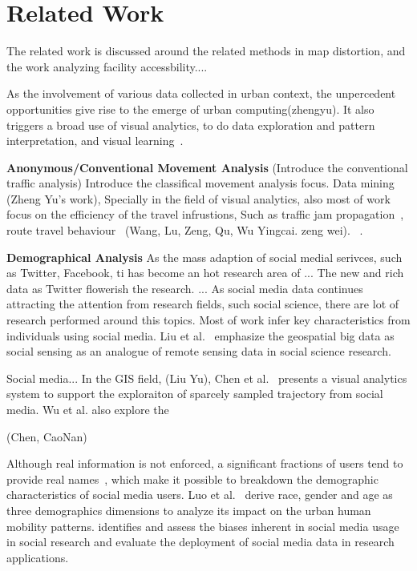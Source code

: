 \section{Related Work}

The related work is discussed around the related methods in map distortion, and the work analyzing facility accessbility....

As the involvement of various data collected in urban context, the unpercedent opportunities give rise to the emerge of urban computing(zhengyu). It also triggers a broad use of visual analytics, to do data exploration and pattern interpretation, and visual learning~\cite{zheng2016visual}. 

\textbf{Anonymous/Conventional Movement Analysis} (Introduce the conventional traffic analysis) Introduce the classifical movement analysis focus. Data mining (Zheng Yu's work), Specially in the field of visual analytics, also most of work focus on the efficiency of the travel infrustions, Such as traffic jam propagation~\cite{wang2013visual}, route travel behaviour~\cite{lu2015trajrank} (Wang, Lu, Zeng, Qu, Wu Yingcai. zeng wei). ~\cite{andrienko2010discovering}. 


\textbf{Demographical Analysis} As the mass adaption of social medial serivces, such as Twitter, Facebook, ti has become an hot research area of ... The new and rich data as Twitter flowerish the research. ... As social media data continues attracting the attention from research fields, such social science, there are lot of research performed around this topics. Most of work infer key characteristics from individuals using social media. Liu et al.~\cite{liu2015social} emphasize the geospatial big data as social sensing as an analogue of remote sensing data in social science research.

Social media...
In the GIS field, (Liu Yu), Chen et al.~\cite{chen2016interactive} presents a visual analytics system to support the exploraiton of sparcely sampled trajectory from social media. Wu et al. also explore the ~\cite{wu2016telcovis}

(Chen, CaoNan)

Although real information is not enforced, a significant fractions of users tend to provide real names~\cite{peddinti2014internet}, which make it possible to breakdown the demographic characteristics of social media users. Luo et al.~\cite{luo2016explore} derive race, gender and age as three demographics dimensions to analyze its impact on the urban human mobility patterns. 
\cite{Longley2015}\cite{Paul2016_twitter} identifies and assess the biases inherent in social media usage in social research and evaluate the deployment of social media data in research applications.  






